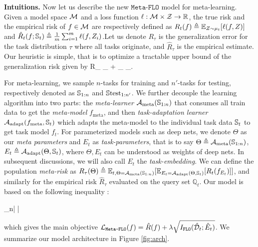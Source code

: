 \documentclass{article}
\theoremstyle{plain}
\theoremstyle{definition}
\theoremstyle{remark}
\newcommand{\FLO}{\texttt{FLO}}
\newcommand{\CA}{\mathcal{A}}
\newcommand{\meta}{\text{meta}}
\newcommand{\adapt}{\text{adapt}}
\newcommand{\metaflo}{\texttt{Meta-FLO}}
\newcommand{\upper}{\text{upper}}
\newcommand{\BQ}{\mathbb{Q}}
\renewcommand{\CD}{\mathcal{D}}
\newcommand{\te}{\text{test}}
\begin{document}
				{\bf Intuitions.} Now let us describe the new $\metaflo$ model for meta-learning. Given a model space $\mathcal{M}$ and a loss function $\ell: \mathcal{M} \times \mathcal{Z} \rightarrow \mathbb{R}$, the true risk and the empirical risk of $f\in \mathcal{M}$ are respectively defined as $R_{t}(f) \triangleq \mathbb{E}_{Z\sim\mu_t}[\ell(f, Z)]$ and $\hat{R}_t(f;\mathbb{S}_t) \triangleq \frac{1}{m} \sum_{i=1}^m \ell(f, Z_i)$.Let us denote $R_{\tau}$ is the generalization error for the task distribution $\tau$ where all tasks originate, and $\hat{R}_{\tau}$ is the empirical estimate.  Our heuristic is simple, that is to optimize a tractable upper bound of the generalization risk given by
				\beq
				R_{\tau} \leq {}_{} + _{} \triangleq \CL_{\upper}. 
				\label{eq:upper}
				\eeq
				
				For meta-learning, we sample $n$-tasks for training and $n'$-tasks for testing, respectively denoted as $\mathbb{S}_{1:n}$ and $\BS\te_{1:n'}$. We further decouple the learning algorithm into two parts: the {\it meta-learner} $\CA_{\meta}(\BS_{1:n})$ that consumes all train data to get the {\it meta-model} $f_{\meta}$, and then {\it task-adaptation learner} $\CA_{\adapt}(f_{\meta}, \BS_t)$ which adapts the meta-model to the individual task data $\mathbb{S}_t$ to get task model $f_t$. For parameterized models such as deep nets, we denote $\Theta$ as our {\it meta parameters} and $E_t$ as {\it task-parameters}, that is to say $\Theta \triangleq \CA_{\meta}(\BS_{1:n})$, $E_t \triangleq \CA_{\adapt}(\Theta, \BS_t)$, where $\Theta, E_t$ can be understood as weights of deep nets. In subsequent discussions, we will also call $E_t$ the {\it task-embedding}. We can define the population {\it meta-risk} as $R_{\tau}(\Theta) \triangleq \EE_{t, \Theta=\CA_{\meta}(\BS_{1:n})}[\EE_{E_t=\CA_{\adapt}(\Theta,\BS_t)}[R_{t}(f_{E_t})]]$, and similarly for the empirical risk $\hat{R}_{\tau}$ evaluated on the query set $\BQ_t$. Our model is based on the following inequality \citep{anonymous2022metaflo}:
				
				\beq
				\lim_{n\rightarrow\infty}| \EE[R -\hat{R}] | \leq  {}
				\label{eq:meta_bound}
				\eeq
				
				
				which gives the main objective $\CL_\texttt{Meta-FLO}(f) = \hat{R}(f) + \lambda \sqrt{I_{\FLO}(\hat{\CD}_t;\hat{E}_t)}$. We summarize our model architecture in Figure \ref{fig:arch}. 
				
\end{document}
